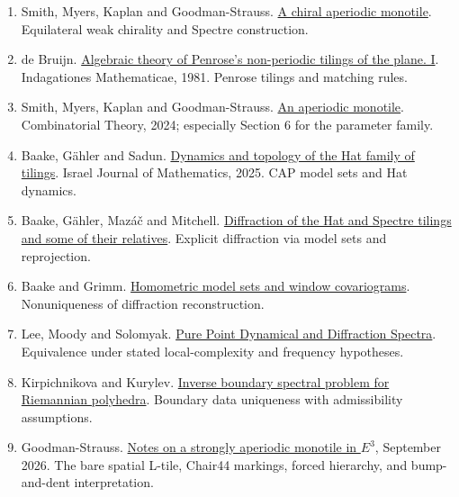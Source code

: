 \documentclass[11pt]{article}
\begin{document}
\begin{enumerate}
\item \hypertarget{ref11}{}Smith, Myers, Kaplan and Goodman-Strauss. \href{https://arxiv.org/abs/2305.17743}{A chiral aperiodic monotile}. Equilateral weak chirality and Spectre construction.

\item \hypertarget{ref12}{}de Bruijn. \href{https://doi.org/10.1016/1385-7258(81)90016-0}{Algebraic theory of Penrose's non-periodic tilings of the plane. I}. Indagationes Mathematicae, 1981. Penrose tilings and matching rules.

\item \hypertarget{ref13}{}Smith, Myers, Kaplan and Goodman-Strauss. \href{https://arxiv.org/abs/2303.10798}{An aperiodic monotile}. Combinatorial Theory, 2024; especially Section 6 for the parameter family.

\item \hypertarget{ref14}{}Baake, Gähler and Sadun. \href{https://arxiv.org/abs/2305.05639}{Dynamics and topology of the Hat family of tilings}. Israel Journal of Mathematics, 2025. CAP model sets and Hat dynamics.

\item \hypertarget{ref15}{}Baake, Gähler, Mazáč and Mitchell. \href{https://arxiv.org/abs/2502.03268}{Diffraction of the Hat and Spectre tilings and some of their relatives}. Explicit diffraction via model sets and reprojection.

\item \hypertarget{ref16}{}Baake and Grimm. \href{https://arxiv.org/abs/math/0610411}{Homometric model sets and window covariograms}. Nonuniqueness of diffraction reconstruction.

\item \hypertarget{ref17}{}Lee, Moody and Solomyak. \href{https://arxiv.org/abs/0910.4809}{Pure Point Dynamical and Diffraction Spectra}. Equivalence under stated local-complexity and frequency hypotheses.

\item \hypertarget{ref18}{}Kirpichnikova and Kurylev. \href{https://arxiv.org/abs/math/0701911}{Inverse boundary spectral problem for Riemannian polyhedra}. Boundary data uniqueness with admissibility assumptions.

\item \hypertarget{ref19}{}Goodman-Strauss. \href{https://arxiv.org/abs/2609.24779}{Notes on a strongly aperiodic monotile in \(E^3\)}, September 2026. The bare spatial L-tile, Chair44 markings, forced hierarchy, and bump-and-dent interpretation.


\end{enumerate}
\end{document}
